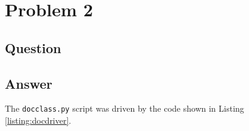 \section{Problem 2}

\subsection{Question}


\subsection{Answer}

The {\tt docclass.py} script was driven by the code shown in Listing \ref{listing:docdriver}.



\clearpage